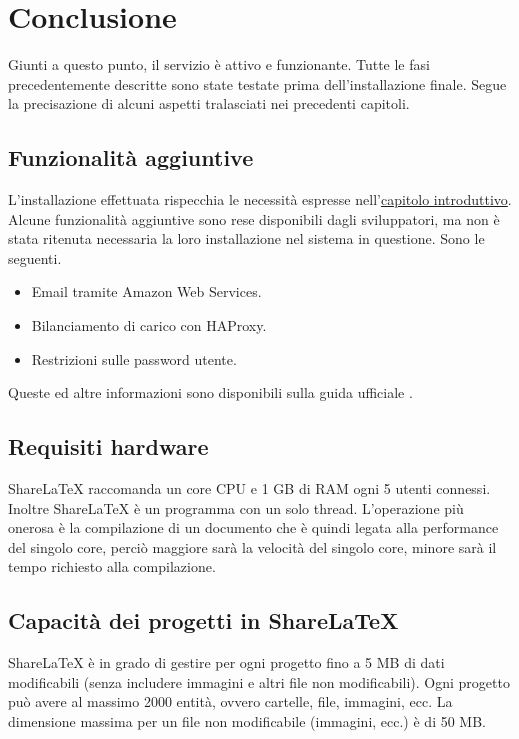 \chapter{Conclusione}
\label{Conclusione}
\thispagestyle{empty}

Giunti a questo punto, il servizio è attivo e funzionante. Tutte le fasi precedentemente descritte sono state testate prima dell'installazione finale. Segue la precisazione di alcuni aspetti tralasciati nei precedenti capitoli.

\section{Funzionalità aggiuntive}
L'installazione effettuata rispecchia le necessità espresse nell'\hyperref[Introduzione]{capitolo introduttivo}. Alcune funzionalità aggiuntive sono rese disponibili dagli sviluppatori, ma non è stata ritenuta necessaria la loro installazione nel sistema in questione. Sono le seguenti.
\begin{itemize}
    \item Email tramite Amazon Web Services.
    \item Bilanciamento di carico con HAProxy.
    \item Restrizioni sulle password utente.
\end{itemize}
Queste ed altre informazioni sono disponibili sulla guida ufficiale \cite{sharelatex_wiki}.

\section{Requisiti hardware}
ShareLaTeX raccomanda un core CPU e 1 GB di RAM ogni 5 utenti connessi. Inoltre ShareLaTeX è un programma con un solo thread. L'operazione più onerosa è la compilazione di un documento che è quindi legata alla performance del singolo core, perciò maggiore sarà la velocità del singolo core, minore sarà il tempo richiesto alla compilazione.

\section{Capacità dei progetti in ShareLaTeX}
ShareLaTeX è in grado di gestire per ogni progetto fino a 5 MB di dati modificabili (senza includere immagini e altri file non modificabili). Ogni progetto può avere al massimo 2000 entità, ovvero cartelle, file, immagini, ecc. La dimensione massima per un file non modificabile (immagini, ecc.) è di 50 MB.